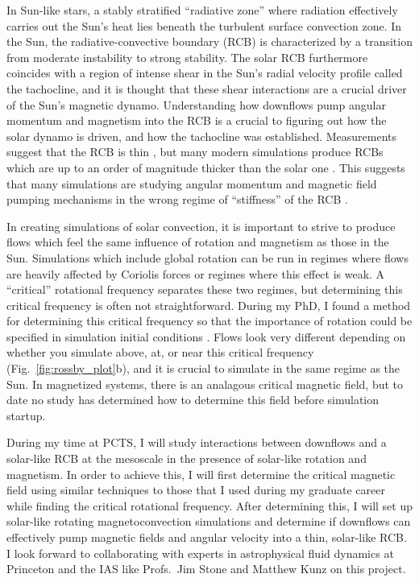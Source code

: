 \documentclass[11pt, preprint]{aastex}
\begin{document}
In Sun-like stars, a stably stratified ``radiative zone'' where radiation effectively carries out the Sun's heat lies beneath the turbulent surface convection zone.
In the Sun, the radiative-convective boundary (RCB) is characterized by a transition from moderate instability to strong stability.
The solar RCB furthermore coincides with a region of intense shear in the Sun's radial velocity profile called the tachocline, and it is thought that these shear interactions are a crucial driver of the Sun's magnetic dynamo.
Understanding how downflows pump angular momentum and magnetism into the RCB is a crucial to figuring out how the solar dynamo is driven, and how the tachocline was established.
Measurements suggest that the RCB is thin \citep{basu1997}, but many modern simulations produce RCBs which are up to an order of magnitude thicker than the solar one \citep{hotta2017}.
This suggests that many simulations are studying angular momentum and magnetic field pumping mechanisms in the wrong regime of ``stiffness'' of the RCB \citep{couston&all2017}.

In creating simulations of solar convection, it is important to strive to produce flows which feel the same influence of rotation and magnetism as those in the Sun.
Simulations which include global rotation can be run in regimes where flows are heavily affected by Coriolis forces or regimes where this effect is weak.
A ``critical'' rotational frequency separates these two regimes, but determining this critical frequency is often not straightforward.
During my PhD, I found a method for determining this critical frequency so that the importance of rotation could be specified in simulation initial conditions \citep[see Fig. \ref{fig:rossby_plot}a and][]{anders&all2019}.
Flows look very different depending on whether you simulate above, at, or near this critical frequency (Fig.~\ref{fig:rossby_plot}b), and it is crucial to simulate in the same regime as the Sun.
In magnetized systems, there is an analagous critical magnetic field, but to date no study has determined how to determine this field before simulation startup.

During my time at PCTS, I will study interactions between downflows and a solar-like RCB at the mesoscale in the presence of solar-like rotation and magnetism.
In order to achieve this, I will first determine the critical magnetic field using similar techniques to those that I used during my graduate career while finding the critical rotational frequency.
After determining this, I will set up solar-like rotating magnetoconvection simulations and determine if downflows can effectively pump magnetic fields and angular velocity into a thin, solar-like RCB.
I look forward to collaborating with experts in astrophysical fluid dynamics at Princeton and the IAS like Profs.~Jim Stone and Matthew Kunz on this project.
\end{document}
